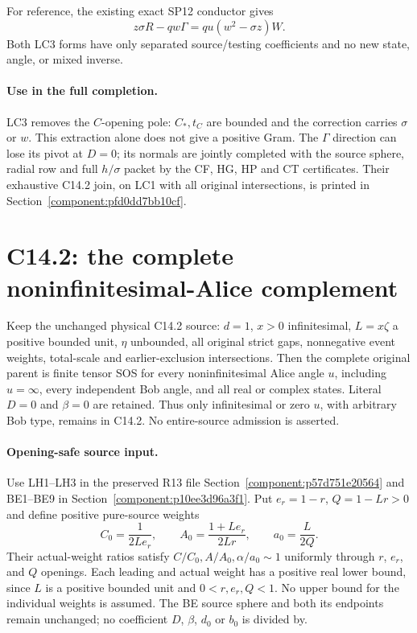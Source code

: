 For reference, the existing exact SP12 conductor gives
\[
 z\sigma R-qw\Gamma=qu(w^2-\sigma z)W.             \tag{LC4}
\]
Both LC3 forms have only separated source/testing coefficients and
no new state, angle, or mixed inverse.

\paragraph{Use in the full completion.}
LC3 removes the $C$-opening pole: $C_*,t_C$ are bounded and the correction carries $\sigma$ or $w$. This extraction alone does not give a positive Gram. The $\Gamma$ direction can lose its pivot at $D=0$; its normals are jointly completed with the source sphere, radial row and full $h/\sigma$ packet by the CF, HG, HP and CT certificates. Their exhaustive C14.2 join, on LC1 with all original intersections, is printed in Section~\ref{component:pfd0dd7bb10cf}.


\section{\texorpdfstring{C14.2: the complete noninfinitesimal-Alice complement}{C14.2: the complete noninfinitesimal-Alice complement}}
\label{component:pb0d9d28d0849}

\label{pb0d9d28d0849:sec:r18-c142-remote}

\begin{proposition}
Keep the unchanged physical C14.2 source: $d=1$, $x>0$
infinitesimal, $L=x\zeta$ a positive bounded unit, $\eta$ unbounded,
all original strict gaps, nonnegative event weights, total-scale and
earlier-exclusion intersections.  Then the complete original parent
is finite tensor SOS for every noninfinitesimal Alice angle $u$,
including $u=\infty$, every independent Bob angle, and all real or
complex states.  Literal $D=0$ and $\beta=0$ are retained.  Thus
only infinitesimal or zero $u$, with arbitrary Bob type, remains in
C14.2.  No entire-source admission is asserted.
\end{proposition}

\paragraph{Opening-safe source input.}
Use LH1--LH3 in the preserved R13 file
Section~\ref{component:p57d751e20564} and BE1--BE9
in Section~\ref{component:p10ee3d96a3f1}.
Put $e_r=1-r$, $Q=1-Lr>0$ and define positive pure-source weights
\[
 C_0=\frac1{2Le_r},\qquad
 A_0=\frac{1+Le_r}{2Lr},\qquad
 a_0=\frac L{2Q}.
                                                               \tag{LA1}
\]
Their actual-weight ratios satisfy
$C/C_0,A/A_0,\alpha/a_0\sim1$ uniformly through $r$, $e_r$,
and $Q$ openings.  Each leading and actual weight has a positive
real lower bound, since $L$ is a positive bounded unit and
$0<r,e_r,Q<1$.  No upper bound for the individual weights is assumed.
The BE source sphere and both its endpoints remain unchanged; no
coefficient $D$, $\beta$, $d_0$ or $b_0$ is divided by.

